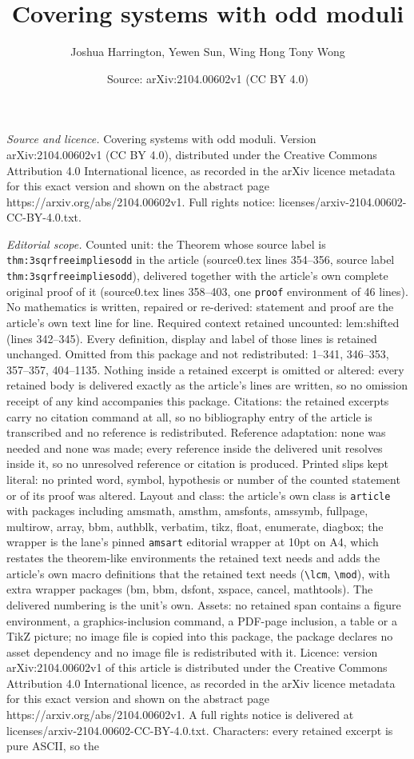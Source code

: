 \documentclass[10pt,a4paper]{amsart}
\title[Covering systems with odd moduli]{Covering systems with odd moduli}
\author{Joshua Harrington, Yewen Sun, Wing Hong Tony Wong}
\date{Source: arXiv:2104.00602v1 (CC BY 4.0)}
\begin{document}
\maketitle

\noindent\emph{Source and licence.} Covering systems with odd moduli. Version arXiv:2104.00602v1 (CC BY 4.0), distributed under the Creative Commons Attribution 4.0 International licence, as recorded in the arXiv licence metadata for this exact version and shown on the abstract page https://arxiv.org/abs/2104.00602v1. Full rights notice: licenses/arxiv-2104.00602-CC-BY-4.0.txt.\par\smallskip

\noindent\textit{Editorial scope.} Counted unit: the Theorem whose source label is \texttt{thm:3sqrfreeimpliesodd} in the article (source0.tex lines 354--356, source label \texttt{thm:3sqrfreeimpliesodd}), delivered together with the article's own complete original proof of it (source0.tex lines 358--403, one \texttt{proof} environment of 46 lines). No mathematics is written, repaired or re-derived: statement and proof are the article's own text line for line. Required context retained uncounted: lem:shifted (lines 342--345). Every definition, display and label of those lines is retained unchanged. Omitted from this package and not redistributed: 1--341, 346--353, 357--357, 404--1135. Nothing inside a retained excerpt is omitted or altered: every retained body is delivered exactly as the article's lines are written, so no omission receipt of any kind accompanies this package. Citations: the retained excerpts carry no citation command at all, so no bibliography entry of the article is transcribed and no reference is redistributed. Reference adaptation: none was needed and none was made; every reference inside the delivered unit resolves inside it, so no unresolved reference or citation is produced. Printed slips kept literal: no printed word, symbol, hypothesis or number of the counted statement or of its proof was altered. Layout and class: the article's own class is \texttt{article} with packages including amsmath, amsthm, amsfonts, amssymb, fullpage, multirow, array, bbm, authblk, verbatim, tikz, float, enumerate, diagbox; the wrapper is the lane's pinned \texttt{amsart} editorial wrapper at 10pt on A4, which restates the theorem-like environments the retained text needs and adds the article's own macro definitions that the retained text needs (\texttt{\textbackslash lcm}, \texttt{\textbackslash mod}), with extra wrapper packages (bm, bbm, dsfont, xspace, cancel, mathtools). The delivered numbering is the unit's own. Assets: no retained span contains a figure environment, a graphics-inclusion command, a PDF-page inclusion, a table or a TikZ picture; no image file is copied into this package, the package declares no asset dependency and no image file is redistributed with it. Licence: version arXiv:2104.00602v1 of this article is distributed under the Creative Commons Attribution 4.0 International licence, as recorded in the arXiv licence metadata for this exact version and shown on the abstract page https://arxiv.org/abs/2104.00602v1. A full rights notice is delivered at licenses/arxiv-2104.00602-CC-BY-4.0.txt. Characters: every retained excerpt is pure ASCII, so the 
\end{document}
